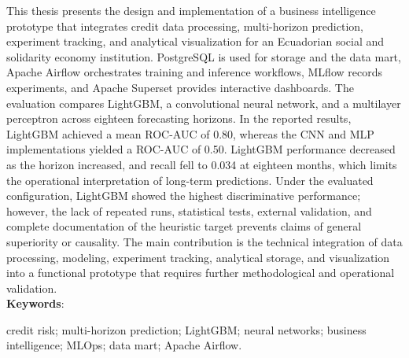 This thesis presents the design and implementation of a business intelligence prototype that integrates credit data processing, multi-horizon prediction, experiment tracking, and analytical visualization for an Ecuadorian social and solidarity economy institution. PostgreSQL is used for storage and the data mart, Apache Airflow orchestrates training and inference workflows, MLflow records experiments, and Apache Superset provides interactive dashboards. The evaluation compares LightGBM, a convolutional neural network, and a multilayer perceptron across eighteen forecasting horizons. In the reported results, LightGBM achieved a mean ROC-AUC of 0.80, whereas the CNN and MLP implementations yielded a ROC-AUC of 0.50. LightGBM performance decreased as the horizon increased, and recall fell to 0.034 at eighteen months, which limits the operational interpretation of long-term predictions. Under the evaluated configuration, LightGBM showed the highest discriminative performance; however, the lack of repeated runs, statistical tests, external validation, and complete documentation of the heuristic target prevents claims of general superiority or causality. The main contribution is the technical integration of data processing, modeling, experiment tracking, analytical storage, and visualization into a functional prototype that requires further methodological and operational validation.\\

\noindent\textbf{Keywords}:

credit risk; multi-horizon prediction; LightGBM; neural networks; business intelligence; MLOps; data mart; Apache Airflow.